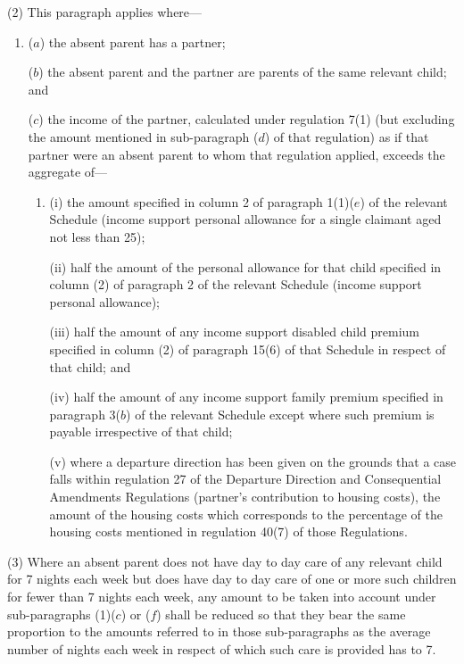 \documentclass[12pt,a4paper]{article}
\begin{document}
(2) This paragraph applies where—
\begin{enumerate}\item[]
($a$) the absent parent has a partner;

($b$) the absent parent and the partner are parents of the same relevant child; and

($c$) the income of the partner, calculated under regulation 7(1) 
(but excluding the amount mentioned in sub-paragraph ($d$) of that regulation) %
as if that partner were an absent parent to whom that regulation applied, exceeds the aggregate of—
\begin{enumerate}\item[]
(i) the amount specified in column 2 of paragraph 1(1)($e$) of the relevant Schedule (income support personal allowance for a single claimant aged not less than 25);

(ii) half the amount of the personal allowance for that child specified in column (2) of paragraph 2 of the relevant Schedule (income support personal allowance);

(iii) half the amount of any income support disabled child premium specified in column (2) of paragraph 15(6) of that Schedule in respect of that child;
and %

(iv) half the amount of any income support family premium specified in paragraph 
3($b$) of the relevant Schedule  %
except where such premium is payable irrespective of that child;%

(v) where a departure direction has been given on the grounds that a case falls
within regulation 27 of the Departure Direction and Consequential Amendments
Regulations (partner’s contribution to housing costs), the amount of the housing
costs which corresponds to the percentage of the housing costs mentioned in
regulation 40(7) of those Regulations.
\end{enumerate}
\end{enumerate}

(3) Where an absent parent does not have day to day care of any relevant child for 7 nights each week but does have day to day care of one or more such children for fewer than 7 nights each week, 
any amount  %
to be taken into account under sub-paragraphs (1)($c$) 
or ($f$)  %
shall be reduced so that they bear the same proportion to the amounts referred to in those sub-paragraphs as the average number of nights each week in respect of which such care is provided has to 7.
\end{document}
